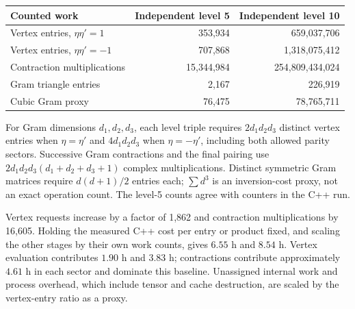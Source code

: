\begin{center}\small
\begin{tabular}{@{}lrr@{}}
\toprule
Counted work & Independent level 5 & Independent level 10\\
\midrule
Vertex entries, $\eta\eta'=1$ & 353,934 & 659,037,706\\
Vertex entries, $\eta\eta'=-1$ & 707,868 & 1,318,075,412\\
Contraction multiplications & 15,344,984 & 254,809,434,024\\
Gram triangle entries & 2,167 & 226,919\\
Cubic Gram proxy & 76,475 & 78,765,711\\
\bottomrule
\end{tabular}
\end{center}
For Gram dimensions $d_1,d_2,d_3$, each level triple requires
$2d_1d_2d_3$ distinct vertex entries when $\eta=\eta'$ and
$4d_1d_2d_3$ when $\eta=-\eta'$, including both allowed parity
sectors. Successive Gram contractions and the final pairing use
$2d_1d_2d_3(d_1+d_2+d_3+1)$ complex multiplications. Distinct symmetric
Gram matrices require $d(d+1)/2$ entries each; $\sum d^3$ is an
inversion-cost proxy, not an exact operation count. The level-5 counts
agree with counters in the C++ run.

Vertex requests increase by a factor of 1,862 and contraction
multiplications by 16,605. Holding the measured C++ cost per entry or
product fixed, and scaling the other stages by their own work counts,
gives $6.55$ h and $8.54$ h. Vertex evaluation contributes $1.90$ h and $3.83$ h;
contractions contribute approximately $4.61$ h in each sector and dominate this baseline.
Unassigned internal work and process overhead, which include tensor and
cache destruction, are scaled by the vertex-entry ratio as a proxy.

